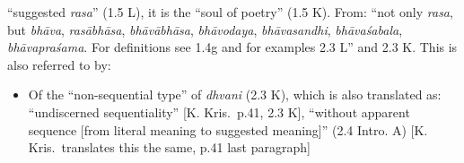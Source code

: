 \documentclass[10pt]{article}
\begin{document}
\begin{multicols}{2}
\begin{enumerate}[
			leftmargin=0em,
			rightmargin=0em,
		]
\begin{enumerate}
			 ``suggested \textit{rasa}'' (1.5 L),
			it is the ``soul of poetry'' (1.5 K).
			From: ``not only \textit{rasa},
			but \textit{bhāva}, %
			\textit{rasābhāsa}, %
			\textit{bhāvābhāsa}, %
			\textit{bhāvodaya}, %
			\textit{bhāvasandhi}, %
			\textit{bhāvaśabala}, %
			\textit{bhāvapraśama}. %
			For definitions see 1.4g and for examples 2.3 L''
			and 2.3 K. %
			This is also referred to by:
			\begin{itemize}
				 rendered as ``rasa, etc.'' in several places in the IMP translation.
				Explained as: ``The term refers to all elements that belong to \textit{rasadhvani}'' (1.4a A, defined 2.5 L) %
				NB: \textit{ādi}: ``etcetera'' (2.3 L)%
				
				

				\item Of the ``non-sequential type'' of \textit{dhvani} (2.3 K),
				      which is also translated as:
				      ``undiscerned sequentiality'' [K. Kris.\ p.41, 2.3 K],
				      ``without apparent sequence [from literal meaning to suggested meaning]'' (2.4 Intro. A)
				      [K. Kris.\ translates this the same, p.41 last paragraph]
			\end{itemize}

		\end{enumerate}


\end{enumerate}
\end{multicols}
\end{document}
